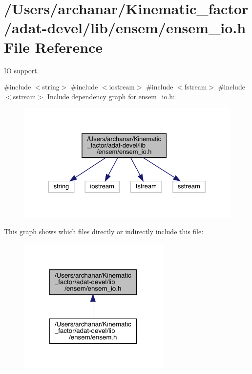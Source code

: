 \hypertarget{adat-devel_2lib_2ensem_2ensem__io_8h}{}\section{/\+Users/archanar/\+Kinematic\+\_\+factor/adat-\/devel/lib/ensem/ensem\+\_\+io.h File Reference}
\label{adat-devel_2lib_2ensem_2ensem__io_8h}


IO support.  


{\ttfamily \#include $<$string$>$}\newline
{\ttfamily \#include $<$iostream$>$}\newline
{\ttfamily \#include $<$fstream$>$}\newline
{\ttfamily \#include $<$sstream$>$}\newline
Include dependency graph for ensem\+\_\+io.\+h\+:
\nopagebreak
\begin{figure}[H]
\begin{center}
\leavevmode
\includegraphics[width=329pt]{df/d4f/adat-devel_2lib_2ensem_2ensem__io_8h__incl}
\end{center}
\end{figure}
This graph shows which files directly or indirectly include this file\+:
\nopagebreak
\begin{figure}[H]
\begin{center}
\leavevmode
\includegraphics[width=214pt]{d7/de1/adat-devel_2lib_2ensem_2ensem__io_8h__dep__incl}
\end{center}
\end{figure}
